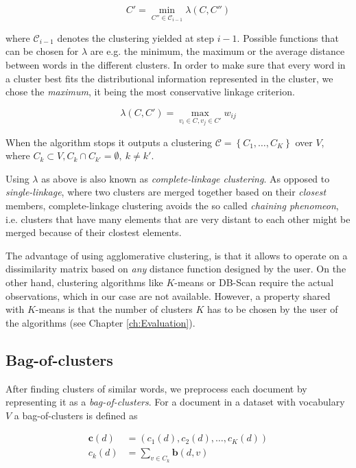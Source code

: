 \begin{equation*}
 C' = \min\limits_{C'' \in \mathcal{C}_{i-1}} \lambda(C,C'') 
\end{equation*}

where $\mathcal{C}_{i-1}$ denotes the clustering yielded at step $i-1$.
Possible functions that can be chosen for $\lambda$ are e.g. the minimum, the
maximum or the average distance between words in the different clusters. In order to make sure that every word in a
cluster best fits the distributional information represented in the cluster, we
chose the \emph{maximum}, it being the most conservative linkage criterion.  

\begin{equation*}
	\lambda(C,C') = \max\limits_{v_i \in C, v_j \in C' } w_{ij} 
\end{equation*}

When the algorithm stops it outputs a clustering $\mathcal{C} = \left\{ C_1,\ldots,C_K \right\} $ 
over $V$, where $C_k \subset V, C_k \cap C_{k'} = \emptyset,~k \neq
k'$. 

Using $\lambda$ as above is also known as \emph{complete-linkage clustering}.
As opposed to \emph{single-linkage}, where two clusters are merged together
based on their \emph{closest} members, complete-linkage clustering avoids the
so called \emph{chaining phenomeon}, i.e. clusters that have many elements
that are very distant to each other might be merged because of their clostest
elements.

The advantage of using agglomerative clustering, is that it allows to operate on
a dissimilarity matrix based on \emph{any} distance function designed by the
user. On the other hand, clustering algorithms like $K$-means or DB-Scan require
the actual observations, which in our case are not available. However, a property 
shared with $K$-means is that the number of clusters $K$ has to be chosen by the
user of the algorithms (see Chapter \ref{ch:Evaluation}).

\subsection{Bag-of-clusters}

After finding clusters of similar words, we preprocess each document by
representing it as a \emph{bag-of-clusters}. For a document in a dataset with
vocabulary $V$ a bag-of-clusters is defined as

\begin{equation*}
\begin{split}
	 \mathbf{c}(d) &= (c_1(d),c_2(d),\ldots,c_K(d)) \\
	 c_k(d) &= \sum\limits_{v \in C_k} \mathbf{b}(d,v)
\end{split}
\end{equation*}

